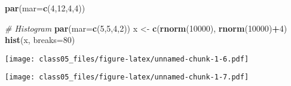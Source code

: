 \documentclass[]{article}
\newenvironment{Shaded}{\begin{snugshade}}{\end{snugshade}}
\newcommand{\KeywordTok}[1]{\textcolor[rgb]{0.13,0.29,0.53}{\textbf{#1}}}
\newcommand{\DataTypeTok}[1]{\textcolor[rgb]{0.13,0.29,0.53}{#1}}
\newcommand{\DecValTok}[1]{\textcolor[rgb]{0.00,0.00,0.81}{#1}}
\newcommand{\StringTok}[1]{\textcolor[rgb]{0.31,0.60,0.02}{#1}}
\newcommand{\CommentTok}[1]{\textcolor[rgb]{0.56,0.35,0.01}{\textit{#1}}}
\newcommand{\OperatorTok}[1]{\textcolor[rgb]{0.81,0.36,0.00}{\textbf{#1}}}
\newcommand{\NormalTok}[1]{#1}
\begin{document}
\begin{Shaded}
\begin{Highlighting}[]
\KeywordTok{par}\NormalTok{(}\DataTypeTok{mar=}\KeywordTok{c}\NormalTok{(}\DecValTok{4}\NormalTok{,}\DecValTok{12}\NormalTok{,}\DecValTok{4}\NormalTok{,}\DecValTok{4}\NormalTok{))}

\CommentTok{# Histogram}
\KeywordTok{par}\NormalTok{(}\DataTypeTok{mar=}\KeywordTok{c}\NormalTok{(}\DecValTok{5}\NormalTok{,}\DecValTok{5}\NormalTok{,}\DecValTok{4}\NormalTok{,}\DecValTok{2}\NormalTok{))}
\NormalTok{x <-}\StringTok{ }\KeywordTok{c}\NormalTok{(}\KeywordTok{rnorm}\NormalTok{(}\DecValTok{10000}\NormalTok{), }\KeywordTok{rnorm}\NormalTok{(}\DecValTok{10000}\NormalTok{)}\OperatorTok{+}\DecValTok{4}\NormalTok{)}
\KeywordTok{hist}\NormalTok{(x, }\DataTypeTok{breaks=}\DecValTok{80}\NormalTok{)}
\end{Highlighting}
\end{Shaded}

\texttt{[image: class05\_files/figure-latex/unnamed-chunk-1-6.pdf]}

\begin{Shaded}
\end{Shaded}

\texttt{[image: class05\_files/figure-latex/unnamed-chunk-1-7.pdf]}

\begin{Shaded}
\end{Shaded}
\end{document}
